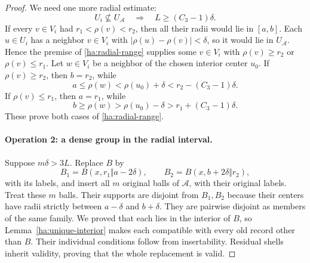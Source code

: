 \begin{proof}
We need one more radial estimate:
\begin{equation}
 U_i\not\subseteq U_{\mathcal A}
       \quad\Longrightarrow\quad L\geq(C_3-1)\delta.
 \label{ha:radial-range}
\end{equation}
If every $v\in V_i$ had $r_1<\rho(v)<r_2$, then all their radii would
lie in $[a,b]$.  Each $u\in U_i$ has a neighbor $v\in V_i$ with
$|\rho(u)-\rho(v)|<\delta$, so it would lie in $U_{\mathcal A}$.
Hence the premise of \eqref{ha:radial-range} supplies some $v\in V_i$
with $\rho(v)\geq r_2$ or $\rho(v)\leq r_1$.  Let $w\in V_i$ be a
neighbor of the chosen interior center $u_0$.
If $\rho(v)\geq r_2$, then $b=r_2$, while
\[
 a\leq\rho(w)<\rho(u_0)+\delta
                  <r_2-(C_3-1)\delta.
\]
If $\rho(v)\leq r_1$, then $a=r_1$, while
\[
 b\geq\rho(w)>\rho(u_0)-\delta
                  >r_1+(C_3-1)\delta.
\]
These prove both cases of \eqref{ha:radial-range}.

\paragraph{\textbf{Operation 2: a dense group in the radial interval.}}
Suppose $m\delta>3L$.  Replace $B$ by
\[
 B_1=B(x,r_1\Vert a-2\delta),\qquad
 B_2=B(x,b+2\delta\Vert r_2),
\]
with its labels, and insert all $m$ original balls of $\mathcal A$,
with their original labels.  Treat these $m$ balls.  Their supports are
disjoint from $B_1,B_2$ because their centers have radii strictly
between $a-\delta$ and $b+\delta$.  They are pairwise disjoint as
members of the same family.  We proved that each lies in the interior
of $B$, so Lemma~\ref{ha:unique-interior} makes each compatible with
every old record other than $B$.  Their individual conditions follow
from insertability.  Residual shells inherit validity, proving that
the whole replacement is valid.


\end{proof}

